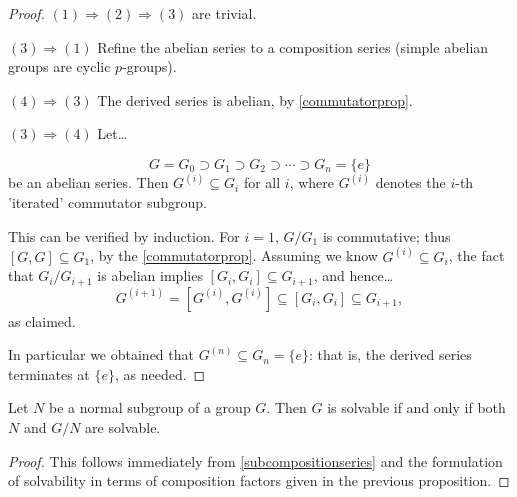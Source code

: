 \begin{proof}
$(1) \Rightarrow (2) \Rightarrow (3)$ are trivial.

$(3) \Rightarrow (1)$ Refine the abelian series to a composition series (simple abelian groups are cyclic $p$-groups).

$(4) \Rightarrow (3)$ The derived series is abelian, by \ref{commutatorprop}.

$(3) \Rightarrow (4)$ Let\dots

$$G = G_0 \supset G_1 \supset G_2 \supset \cdots \supset G_n = \{ e \}$$
be an abelian series. Then $G^{(i)} \subseteq G_i$ for all $i$, where $G^{(i)}$ denotes the $i$-th 'iterated' commutator subgroup.

This can be verified by induction. For $i = 1$, $G / G_1$ is commutative; thus $[G,G] \subseteq G_1$, by the \ref{commutatorprop}.
Assuming we know $G^{(i)} \subseteq G_i$, the fact that $G_i / G_{i+1}$ is abelian implies $[G_i,G_i] \subseteq G_{i+1}$, and hence\dots
$$G^{(i+1)} = [G^{(i)}, G^{(i)}] \subseteq [G_i, G_i] \subseteq G_{i+1},$$
as claimed.

In particular we obtained that $G^{(n)} \subseteq G_n = \{ e \}$: that is, the derived series terminates at $\{ e \}$, as needed.
\end{proof}

\begin{corollary}
Let $N$ be a normal subgroup of a group $G$. Then $G$ is solvable if and only if both $N$ and $G/N$ are solvable.
\end{corollary}

\begin{proof}
This follows immediately from \ref{subcompositionseries} and the formulation of solvability in terms of composition factors given in the previous proposition.
\end{proof}